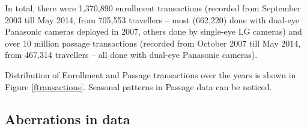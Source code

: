 \documentclass{cta-author}%
\newcommand{\cmt}[1]{}
\begin{document}
In total, there were 1,370,890 enrollment transactions (recorded from September 2003 till May 2014,
from 
705,553
travellers --  
most  (662,220)  done with dual-eye Panasonic cameras deployed in 2007, others done by single-eye LG  cameras) 
and over 10 million passage transactions (recorded from October 2007 till May 2014, from 467,314 travellers  -- 
all done with dual-eye Panasonic cameras).
\cmt{
Enrollment images prior to June 2007 are all captured using single-eye LG (`L') cameras. After June 2007, most of them are captured using new Panasonic cameras, some however were still captured by old LG cameras.
All passage images in the dataset are captured using new Panasonic cameras.  
}
Distribution of Enrollment and Passage transactions over the years is shown in Figure \ref{ftransactions}. Seasonal patterns in Passage data can be noticed.
\cmt{
In total,
1,370,890 enrollment transactions from 2003 till 2014
from 
705,553
travellers were recorded, of which 43,338 were enrolled with 'L' camera... ,  
and over 10 million passage transactions were recorded 
466,070 travellers
from October 2007 till May 2014 from 467,314 travellers (see Figure \ref{ftransactions}).

}

\cmt{
person's FAKE ID, gender, age at the time of enrollment, enrollment date (month, year, time of the day), \textbf{eye enrolled} - left or light,  \textbf{camera used} - LG (''L'') or Panasonic(``B'') and 
fourteen image quality scores, including pupil dilation score which was used in the studies conducted by NIST and UND 

}

\subsection{Aberrations in data}
\end{document}
